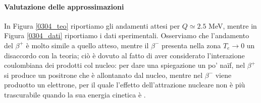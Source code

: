 \paragraph{Valutazione delle approssimazioni} In Figura \ref{0304_teo} riportiamo gli andamenti attesi per $Q\simeq 2.5$ MeV, mentre in Figura \ref{0304_dati} riportiamo i dati sperimentali. Osserviamo che l'andamento del $\beta^+$ è molto simile a quello atteso, mentre il $\beta^-$ presenta nella zona $T_e\to0$ un disaccordo con la teoria; ciò è dovuto al fatto di aver considerato l'interazione coulombiana dei prodotti col nucleo: per dare una spiegazione un po' na\"{i}f, nel $\beta^+$ si produce un positrone che è allontanato dal nucleo, mentre nel $\beta^-$ viene produotto un elettrone, per il quale l'effetto dell'attrazione nucleare non è più trascurabile quando la sua energia cinetica è .

